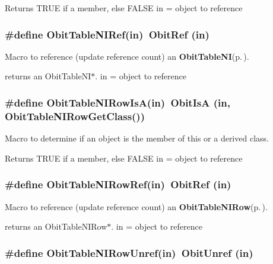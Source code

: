 Returns TRUE if a member, else FALSE in = object to reference 
\subsubsection{\setlength{\rightskip}{0pt plus 5cm}\#define Obit\-Table\-NIRef(in)\ Obit\-Ref (in)}\label{ObitTableNI_8h_a2}


Macro to reference (update reference count) an {\bf Obit\-Table\-NI}{\rm (p.\,\pageref{structObitTableNI})}. 

returns an Obit\-Table\-NI$\ast$. in = object to reference 
\subsubsection{\setlength{\rightskip}{0pt plus 5cm}\#define Obit\-Table\-NIRow\-Is\-A(in)\ Obit\-Is\-A (in, Obit\-Table\-NIRow\-Get\-Class())}\label{ObitTableNI_8h_a6}


Macro to determine if an object is the member of this or a derived class. 

Returns TRUE if a member, else FALSE in = object to reference 
\subsubsection{\setlength{\rightskip}{0pt plus 5cm}\#define Obit\-Table\-NIRow\-Ref(in)\ Obit\-Ref (in)}\label{ObitTableNI_8h_a5}


Macro to reference (update reference count) an {\bf Obit\-Table\-NIRow}{\rm (p.\,\pageref{structObitTableNIRow})}. 

returns an Obit\-Table\-NIRow$\ast$. in = object to reference 
\subsubsection{\setlength{\rightskip}{0pt plus 5cm}\#define Obit\-Table\-NIRow\-Unref(in)\ Obit\-Unref (in)}\label{ObitTableNI_8h_a4}


